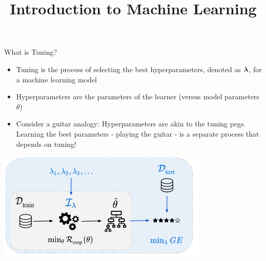 \documentclass[11pt,compress,t,notes=noshow, xcolor=table]{beamer}
\title{Introduction to Machine Learning}
\date{}
\begin{document}
\sloppy



\begin{vbframe}{What is Tuning?}
\begin{itemize}
\item \small Tuning is the process of selecting the best hyperparameters, denoted as $\bm{\lambda}$, for a machine learning model
\item \small Hyperparameters are the parameters of the learner (versus model parameters $\theta$)
\item \small Consider a guitar analogy: Hyperparameters are akin to the tuning pegs. Learning the best parameters \bm{$\thetabh$} - playing the guitar - is a separate process that depends on tuning!
\end{itemize}

\begin{center}
\includegraphics[width = 0.75\textwidth]{figure_man/riskmin_bilevel3.png}
\end{center}

\end{vbframe}
\end{document}
